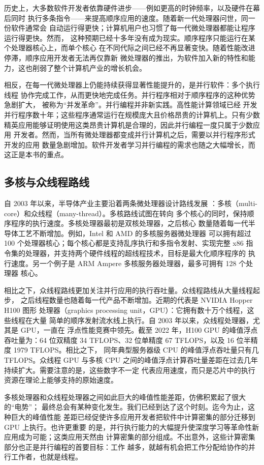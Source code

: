 历史上，大多数软件开发者依靠硬件进步——例如更高的时钟频率，以及硬件在幕后同时
执行多条指令——来提高顺序应用的速度。随着新一代处理器问世，同一份软件通常会
自动运行得更快；计算机用户也习惯了每一代微处理器都能让程序运行得更快。然而，
这种预期已经十多年没有成为现实。顺序程序只能运行在某个处理器核心上，而单个核心
在不同代际之间已经不再显著变快。随着性能改进停滞，顺序应用开发者无法再仅靠新
微处理器的推出，为软件加入新的特性和能力，这也削弱了整个计算机产业的增长机会。

相反，在每一代微处理器上仍能持续获得显著性能提升的，是并行软件：多个执行线程
协作完成工作，从而更快地完成任务。并行程序相对于顺序程序的这种优势急剧扩大，
被称为“并发革命”\cite{sutter2005}。并行编程并非新实践。高性能计算领域已经
开发并行程序数十年；这些程序通常运行在规模庞大且价格昂贵的计算机上。只有少数
精英应用能够证明使用这类昂贵计算机是合理的，因此并行编程一度只属于少数应用
开发者。然而，当所有微处理器都变成并行计算机之后，需要以并行程序形式开发的应用
数量急剧增加。软件开发者学习并行编程的需求也随之大幅增长，而这正是本书的重点。

\subsection{多核与众线程路线}

自 2003 年以来，半导体产业主要沿着两条微处理器设计路线发展
\cite{hwu2008}：多核（multi-core）和众线程（many-thread）。多核路线试图在转向
多个核心的同时，保持顺序程序的执行速度。多核处理器最初是双核处理器，之后核心
数量随着每一代半导体工艺不断增加。例如，Intel 和 AMD 的多核服务器微处理器
可以拥有超过 100 个处理器核心；每个核心都是支持乱序执行和多指令发射、实现完整
x86 指令集的处理器，并支持两个硬件线程的超线程技术，目标是最大化顺序程序的
执行速度。另一个例子是 ARM Ampere 多核服务器处理器，最多可拥有 128 个处理器
核心。

相比之下，众线程路线更加关注并行应用的执行吞吐量。众线程路线从大量线程起步，
之后线程数量也随着每一代产品不断增加。近期的代表是 NVIDIA Hopper H100 图形
处理器（graphics processing unit，GPU）：它拥有数十万个线程，这些线程在大量
简单的顺序发射流水线上执行。自 2003 年以来，众线程处理器，尤其是 GPU，一直在
浮点性能竞赛中领先。截至 2022 年，H100 GPU 的峰值浮点吞吐量为：64 位双精度
34 TFLOPS、32 位单精度 67 TFLOPS，以及 16 位半精度 1979 TFLOPS。相比之下，
同年典型服务器级 CPU 的峰值浮点吞吐量只有几 TFLOPS。众线程 GPU 与多核 CPU
之间的峰值浮点计算吞吐量差距在过去几年持续扩大。需要注意的是，这些数字不一定
代表应用速度，而只是芯片中的执行资源在理论上能够支持的原始速度。

多核处理器和众线程处理器之间如此巨大的峰值性能差距，仿佛积累起了很大的“电势”；
最终总会有某种变化发生。我们已经到达了这个时刻。迄今为止，这种巨大的峰值性能
差距已经促使许多应用开发者把软件中计算密集的部分迁移到 GPU 上执行。也许更重要
的是，并行执行能力的大幅提升使深度学习等革命性新应用成为可能；这类应用天然由
计算密集的部分组成。不出意外，这些计算密集部分也正是并行编程的首要目标：工作
越多，就越有机会把工作分配给协作的并行工作者，也就是线程。

